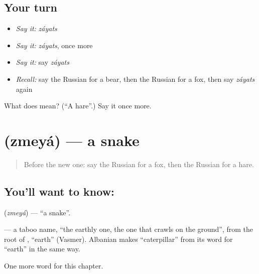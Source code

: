 \subsection*{Your turn}
\begin{itemize}
\raggedright
  \item \emph{Say it:} \emph{záyats}
  \item \emph{Say it:} \emph{záyats}, once more
  \item \emph{Say it:} say \emph{záyats}
  \item \emph{Recall:} say the Russian for a bear, then the Russian for a fox, then say \emph{záyats} again
\end{itemize}

\begin{tcolorbox}[breakable,colback=teal!4,colframe=teal!35!black,title={Before you move on}]
What does  mean? (\textquotedblleft{}A hare\textquotedblright{}.) Say it once more.
\end{tcolorbox}
\section[\texorpdfstring{\ru{змея} (zmeyá)}{змея (zmeyá)}]{ (zmeyá) — a snake}

\label{lesson:RU-C62-snake}



\begin{quote}
Before the new one: say the Russian for a fox, then the Russian for a hare.
\end{quote}

\subsection*{You'll want to know: }
\textbf{} (\emph{zmeyá}) — \textquotedblleft{}a snake\textquotedblright{}.

\begin{cousinweb}
\textbf{} — a taboo name, \textquotedblleft{}the earthly one, the one that crawls on the ground\textquotedblright{}, from the root of \emph{}, \textquotedblleft{}earth\textquotedblright{} (Vasmer). Albanian makes \textquotedblleft{}caterpillar\textquotedblright{} from its word for \textquotedblleft{}earth\textquotedblright{} in the same way.
\end{cousinweb}

\begin{grammarlens}[title={What you've built}]
One more word for this chapter.
\end{grammarlens}

